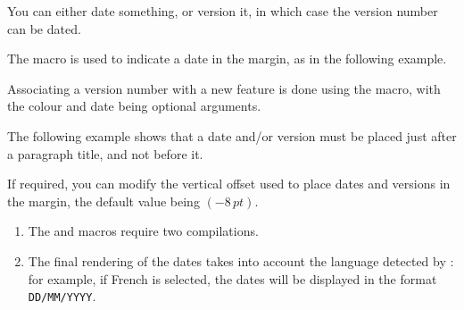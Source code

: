 You can either date something, or version it, in which case the version number can be dated.




\begin{tdocexa}
    The  macro is used to indicate a date in the margin, as in the following example.


\end{tdocexa}




\begin{tdocexa}
    Associating a version number with a new feature is done using the  macro, with the colour and date being optional arguments.


\end{tdocexa}


\begin{tdocexa}
	The following example shows that a date and/or version must be placed just after a paragraph title, and not before it.


\end{tdocexa}


\begin{tdocexa}
	If required, you can modify the vertical offset used to place dates and versions in the margin, the default value being $(-8\,\mathit{pt})$.


\end{tdocexa}


\begin{tdocimp}
    \begin{enumerate}[wide]
        \item The  and  macros require two compilations.

        \item The final rendering of the dates takes into account the language detected by \thisproj{}: for example, if French is selected, the dates will be displayed in the format \texttt{DD/MM/YYYY}.
    \end{enumerate}
\end{tdocimp}


